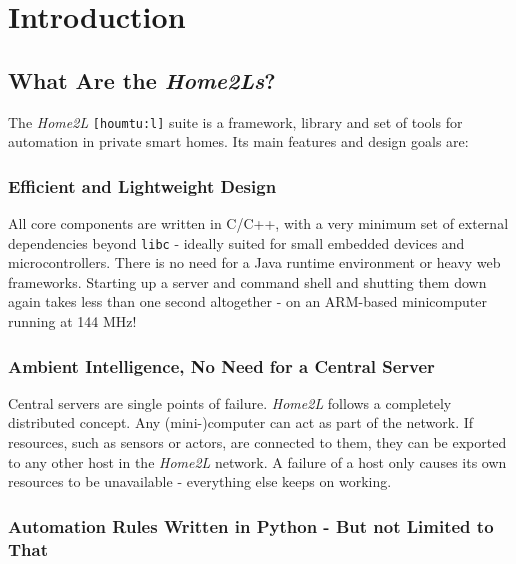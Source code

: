 \documentclass[12pt,english,parskip=half]{scrreprt}
\begin{document}
%
%
\chapter{Introduction}
\label{ch:intro}
%
%



\section{What Are the \emph{Home2Ls}?}
\label{sec:intro-overview}


The \emph{Home2L} \texttt{[houmtu:l]} suite is a framework, library and set of tools 
for automation in private smart homes. Its main features and design goals are:


\subsection*{Efficient and Lightweight Design}

All core components are written in C/C++, with a very minimum set of external
dependencies beyond \texttt{libc} - ideally suited for small embedded devices and
microcontrollers. There is no need for a Java runtime environment or heavy web
frameworks. Starting up a server and command shell and shutting them down again
takes less than one second altogether - on an ARM-based minicomputer running
at 144 MHz!


\subsection*{Ambient Intelligence, No Need for a Central Server}

Central servers are single points of failure. \emph{Home2L} follows a completely
distributed concept. Any (mini-)computer can act as part of the network. If
resources, such as sensors or actors, are connected to them, they can be
exported to any other host in the \emph{Home2L} network. A failure of a host only
causes its own resources to be unavailable - everything else keeps on working.


\subsection*{Automation Rules Written in Python - But not Limited to That}
\end{document}
